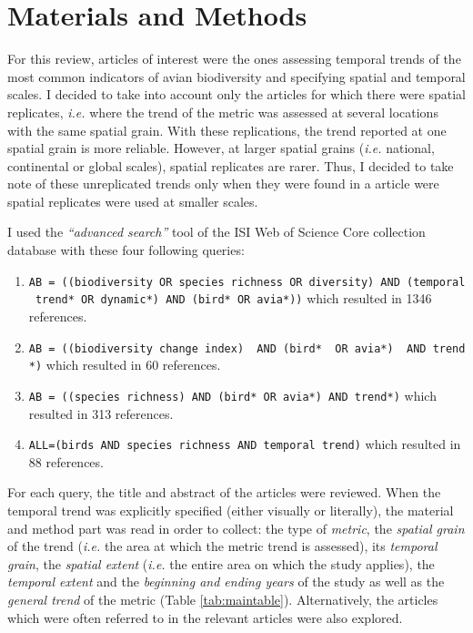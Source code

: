 \documentclass[
  12pt,
  oneside]{report}
\begin{document}
\hypertarget{materials-and-methods}{%
\chapter{Materials and Methods}\label{materials-and-methods}}

For this review, articles of interest were the ones assessing temporal trends of the most common indicators of avian biodiversity and specifying spatial and temporal scales. I decided to take into account only the articles for which there were spatial replicates, \emph{i.e.} where the trend of the metric was assessed at several locations with the same spatial grain. With these replications, the trend reported at one spatial grain is more reliable. However, at larger spatial grains (\emph{i.e.} national, continental or global scales), spatial replicates are rarer. Thus, I decided to take note of these unreplicated trends only when they were found in a article were spatial replicates were used at smaller scales.

I used the \emph{``advanced search''} tool of the ISI Web of Science Core collection database with these four following queries:

\begin{enumerate}
\def\labelenumi{\arabic{enumi}.}
\item
  \texttt{AB\ =\ ((biodiversity\ OR\ species\ richness\ OR\ diversity)\ AND\ (temporal\ trend*\ OR\ dynamic*)\ AND\ (bird*\ OR\ avia*))} which resulted in 1346 references.
\item
  \texttt{AB\ =\ ((biodiversity\ change\ index)\ \ AND\ (bird*\ \ OR\ avia*)\ \ AND\ trend*)} which resulted in 60 references.
\item
  \texttt{AB\ =\ ((species\ richness)\ AND\ (bird*\ OR\ avia*)\ AND\ trend*)} which resulted in 313 references.
\item
  \texttt{ALL=(birds\ AND\ species\ richness\ AND\ temporal\ trend)} which resulted in 88 references.
\end{enumerate}

For each query, the title and abstract of the articles were reviewed. When the temporal trend was explicitly specified (either visually or literally), the material and method part was read in order to collect: the type of \emph{metric}, the \emph{spatial grain} of the trend (\emph{i.e.} the area at which the metric trend is assessed), its \emph{temporal grain}, the \emph{spatial extent} (\emph{i.e.} the entire area on which the study applies), the \emph{temporal extent} and the \emph{beginning and ending years} of the study as well as the \emph{general trend} of the metric (Table \ref{tab:maintable}). Alternatively, the articles which were often referred to in the relevant articles were also explored.
\end{document}
